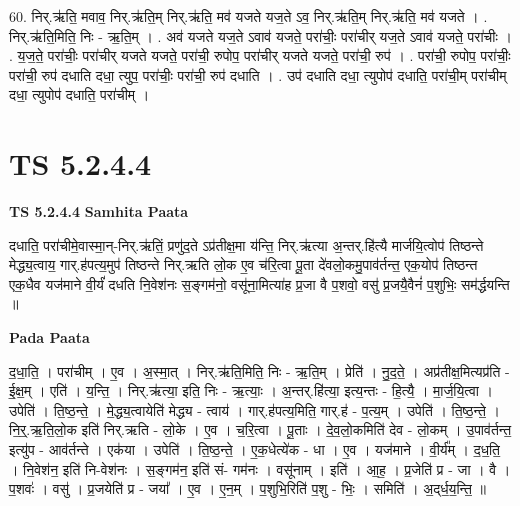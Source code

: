 \documentclass[17pt]{extarticle}
\begin{document}
60. निर्.ऋ॑ति॒ मवाव॒ निर्.ऋ॑ति॒म् निर्.ऋ॑ति॒ मव॑ यजते यज॒ते ऽव॒ निर्.ऋ॑ति॒म् निर्.ऋ॑ति॒ मव॑ यजते । . निर्.ऋ॑ति॒मिति॒ निः - ऋ॒ति॒म् । . अव॑ यजते यज॒ते ऽवाव॑ यजते॒ परा॑चीः॒ परा॑चीर् यज॒ते ऽवाव॑ यजते॒ परा॑चीः । . य॒ज॒ते॒ परा॑चीः॒ परा॑चीर् यजते यजते॒ परा॑ची॒ रुपोप॒ परा॑चीर् यजते यजते॒ परा॑ची॒ रुप॑ । . परा॑ची॒ रुपोप॒ परा॑चीः॒ परा॑ची॒ रुप॑ दधाति दधा॒ त्युप॒ परा॑चीः॒ परा॑ची॒ रुप॑ दधाति । . उप॑ दधाति दधा॒ त्युपोप॑ दधाति॒ परा॑ची॒म् परा॑चीम् दधा॒ त्युपोप॑ दधाति॒ परा॑चीम् । \newline
\pagebreak
{}

\section{ TS 5.2.4.4 }

\textbf{TS 5.2.4.4 } \newline
\textbf{Samhita Paata} \newline

दधाति॒ परा॑चीमे॒वास्मा॒न्-निर्.ऋ॑तिं॒ प्रणु॑द॒ते ऽप्र॑तीक्ष॒मा य॑न्ति॒ निर्.ऋ॑त्या अ॒न्तर्.हि॑त्यै मार्जयि॒त्वोप॑ तिष्ठन्ते मेद्ध्य॒त्वाय॒ गार्.ह॑पत्य॒मुप॑ तिष्ठन्ते निर्.ऋति लो॒क ए॒व च॑रि॒त्वा पू॒ता दे॑वलो॒कमु॒पाव॑र्तन्त॒ एक॒योप॑ तिष्ठन्त एक॒धैव यज॑माने वी॒र्यं॑ दधति नि॒वेश॑नः स॒ङ्गम॑नो॒ वसू॑ना॒मित्या॑ह प्र॒जा वै प॒शवो॒ वसु॑ प्र॒जयै॒वैनं॑ प॒शुभिः॒ सम॑र्द्धयन्ति ॥ \newline

\textbf{Pada Paata} \newline

द॒धा॒ति॒ । परा॑चीम् । ए॒व । अ॒स्मा॒त् । निर्.ऋ॑ति॒मिति॒ निः - ऋ॒ति॒म् । प्रेति॑ । नु॒द॒ते॒ । अप्र॑तीक्ष॒मित्यप्र॑ति - ई॒क्ष॒म् । एति॑ । य॒न्ति॒ । निर्.ऋ॑त्या॒ इति॒ निः - ऋ॒त्याः॒ । अ॒न्तर्.हि॑त्या॒ इत्य॒न्तः - हि॒त्यै॒ । मा॒र्ज॒यि॒त्वा । उपेति॑ । ति॒ष्ठ॒न्ते॒ । मे॒द्ध्य॒त्वायेति॑ मेद्ध्य - त्वाय॑ । गार्.ह॑पत्य॒मिति॒ गार्.ह॑ - प॒त्य॒म् । उपेति॑ । ति॒ष्ठ॒न्ते॒ । नि॒र्॒.ऋ॒ति॒लो॒क इति॑ निर्.ऋति - लो॒के । ए॒व । च॒रि॒त्वा । पू॒ताः । दे॒व॒लो॒कमिति॑ देव -  लो॒कम् । उ॒पाव॑र्तन्त॒ इत्यु॑प - आव॑र्तन्ते । एक॑या । उपेति॑ । ति॒ष्ठ॒न्ते॒ । ए॒क॒धेत्ये॑क - धा । ए॒व । यज॑माने । वी॒र्य᳚म् । द॒ध॒ति॒ । नि॒वेश॑न॒ इति॑ नि-वेश॑नः । स॒ङ्गम॑न॒ इति॑ सं- गम॑नः । वसू॑नाम् । इति॑ । आ॒ह॒ । प्र॒जेति॑ प्र - जा । वै ।   प॒शवः॑ । वसु॑ । प्र॒जयेति॑ प्र - जया᳚ । ए॒व । ए॒न॒म् । प॒शुभि॒रिति॑ प॒शु - भिः॒ । समिति॑ । अ॒द्‌र्ध॒य॒न्ति॒ ॥  \newline
\end{document}
